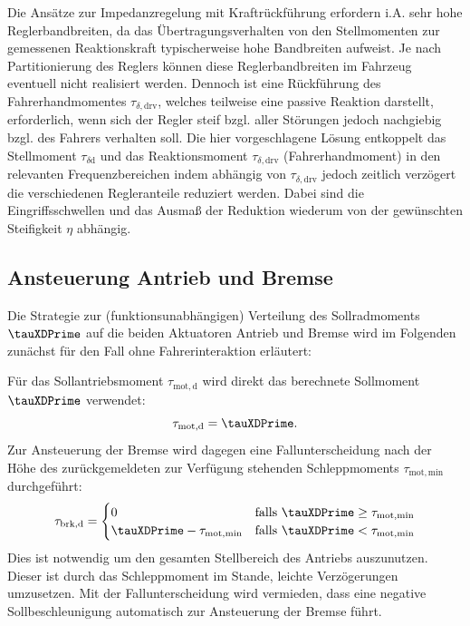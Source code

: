 Die Ansätze zur Impedanzregelung mit Kraftrückführung erfordern i.A. sehr hohe Reglerbandbreiten, da das Übertragungsverhalten von den Stellmomenten zur gemessenen Reaktionskraft typischerweise hohe Bandbreiten aufweist. Je nach Partitionierung des Reglers können diese Reglerbandbreiten im Fahrzeug eventuell nicht realisiert werden. Dennoch ist eine Rückführung des Fahrerhandmomentes $\tau_{\delta\mathrm{,drv}}$, welches teilweise eine passive Reaktion darstellt, erforderlich, wenn sich der Regler steif bzgl. aller Störungen jedoch nachgiebig bzgl. des Fahrers verhalten soll. Die hier vorgeschlagene Lösung entkoppelt das Stellmoment $\tau_{\delta\mathrm{d}}$ und das Reaktionsmoment $\tau_{\delta\mathrm{,drv}}$ (Fahrerhandmoment) in den relevanten Frequenzbereichen indem abhängig von $\tau_{\delta\mathrm{,drv}}$ jedoch zeitlich verzögert die verschiedenen Regleranteile reduziert werden. Dabei sind die Eingriffsschwellen und das Ausmaß der Reduktion wiederum von der gewünschten Steifigkeit $\eta$ abhängig.




\subsection{Ansteuerung Antrieb und Bremse}
Die Strategie zur (funktionsunabhängigen) Verteilung des Sollradmoments $\tauXDPrime$ auf die beiden Aktuatoren Antrieb und Bremse wird im Folgenden zunächst für den Fall ohne Fahrerinteraktion erläutert: 

Für das Sollantriebsmoment $\tau_\mathrm{mot,d}$ wird direkt das berechnete Sollmoment $\tauXDPrime$ verwendet: 
\begin{equation}
\tau_\mathrm{mot,d}=  \tauXDPrime.
\end{equation}
Zur Ansteuerung der Bremse wird dagegen eine Fallunterscheidung nach der Höhe des zurückgemeldeten zur Verfügung stehenden Schleppmoments $\tau_\mathrm{mot,min}$ durchgeführt:
\begin{equation}\label{eq:pka_bremse}
\tau_\mathrm{brk,d}=\begin{cases} 
0 & \text{falls } \tauXDPrime \geq \tau_\mathrm{mot,min}\\
\tauXDPrime -  \tau_\mathrm{mot,min} & \text{falls }  \tauXDPrime < \tau_\mathrm{mot,min}
\end{cases}
\end{equation}
Dies ist notwendig um den gesamten Stellbereich des Antriebs auszunutzen.  Dieser ist durch das Schleppmoment im Stande, leichte Verzögerungen umzusetzen. Mit der Fallunterscheidung wird vermieden, dass eine negative Sollbeschleunigung automatisch zur Ansteuerung der Bremse führt.

